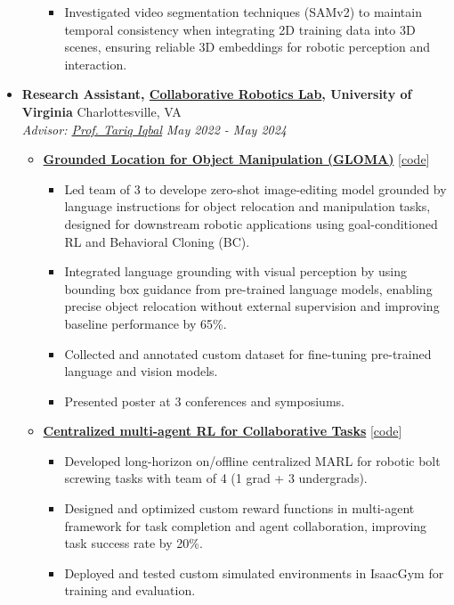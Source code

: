 \documentclass[letterpaper,11pt]{article}
\newcommand{\linkhref}[2]{\textcolor{linkblue}{\href{#1}{#2}}}
\newcommand{\Date}[1]{\textit{\small #1}}
\newcommand{\heading}[4]{
  \textbf{#1} \hfill #2 \\
  \textit{\small#3} \hfill \Date{#4}
}
\begin{document}
\begin{itemize}[label={}, leftmargin=0pt]
\begin{itemize}
\begin{itemize}
                  \item Investigated video segmentation techniques (SAMv2) to maintain temporal consistency when integrating 2D training data into 3D scenes, ensuring reliable 3D embeddings for robotic perception and interaction.
                \end{itemize}
        \end{itemize}
  \item \heading{Research Assistant, \href{https://www.collabrobotics.com/}{Collaborative Robotics Lab}, University of Virginia}{Charlottesville, VA}
        {Advisor: \href{https://www.tiqbal.com/}{Prof. Tariq Iqbal}}{May 2022 - May 2024}
        \begin{itemize}
          \item \href{https://github.com/branyang02/GLOMA}{\textbf{Grounded Location for Object Manipulation (GLOMA)}} [\linkhref{https://github.com/branyang02/GLOMA}{code}]
                \begin{itemize}
                  \item Led team of 3 to develope zero-shot image-editing model grounded by language instructions for object relocation and manipulation tasks, designed for downstream robotic applications using goal-conditioned RL and Behavioral Cloning (BC).
                  \item Integrated language grounding with visual perception by using bounding box guidance from pre-trained language models, enabling precise object relocation without external supervision and improving baseline performance by 65\%.
                  \item Collected and annotated custom dataset for fine-tuning pre-trained language and vision models.
                  \item Presented poster at 3 conferences and symposiums.
                \end{itemize}
          \item \textbf{\href{https://github.com/branyang02/PandaFactory}{Centralized multi-agent RL for Collaborative Tasks}} [\linkhref{https://github.com/branyang02/PandaFactory}{code}]
                \begin{itemize}
                  \item Developed long-horizon on/offline centralized MARL for robotic bolt screwing tasks with team of 4 (1 grad + 3 undergrads).
                  \item Designed and optimized custom reward functions in multi-agent framework for task completion and agent collaboration, improving task success rate by 20\%.
                  \item Deployed and tested custom simulated environments in IsaacGym for training and evaluation.
                \end{itemize}
        \end{itemize}
\end{itemize}
\end{document}
